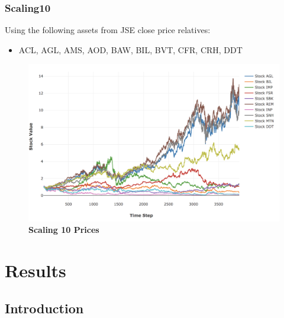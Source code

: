 \documentclass[a4paper,11pt,oneside]{article}
\theoremstyle{plain}
\theoremstyle{definition}
\begin{document}
\subsubsection{Scaling10}\label{dataset_scaling10}

Using the following assets from JSE close price relatives:

\begin{itemize}
	\item ACL, AGL, AMS, AOD, BAW, BIL, BVT, CFR, CRH, DDT
\end{itemize}

\begin{figure}[H]
	\centering
	\includegraphics[scale=0.4]{images/results/prices/scaling10_prices.png} 
	\caption[Scaling 10 Prices]{\textbf{Scaling 10 Prices}}
	\label{figure-scaling0_prices}
\end{figure}










\newpage
\section{Results}\label{Results}
\subsection{Introduction}
\end{document}
